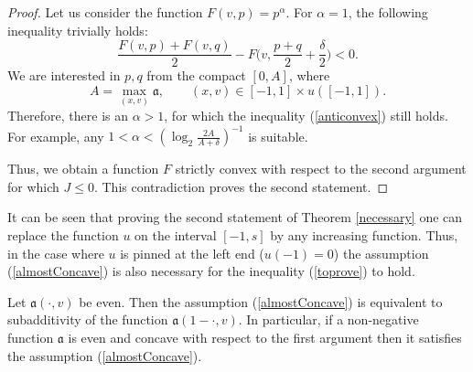 \begin{proof}
Let us consider the function $F(v, p) = p ^ \alpha$.
For $\alpha = 1$, the following inequality trivially holds:
\begin{equation}
\label{anticonvex}
\frac{F(v, p) + F(v, q)}{ 2 } - F\big(v, \frac{p + q}{ 2 } + \frac{\delta}{ 2 }\big) <0.
\end{equation}
We are interested in $p, q$ from the compact $[0 , A]$,
where 
\begin{equation}
\label{weightMax}
A=\max \limits_{(x, v)} \mathfrak a,\qquad (x, v) \in [-1, 1 ] \times u([-1, 1] ).
\end{equation}
Therefore, there is an $\alpha> 1$, for which the inequality (\ref{anticonvex})
still holds.
For example, any $1 < \alpha < (\log_2 \frac{ 2 A}{A + \delta})^{-1}$ is suitable.

Thus, we obtain a function $F$ strictly convex with respect to the second argument
for which $J \le 0$. This contradiction proves the second statement.
\end{proof}

\begin{rem}
\label{landesNecessary}
It can be seen that proving the second statement of Theorem \ref{necessary}
one can replace the function $u$ on the interval $[-1, s]$ by any increasing function.
Thus, in the case where $u$ is pinned at the left end {\rm ($u(-1) = 0$)}
the assumption (\ref{almostConcave}) is also necessary for the inequality (\ref{toprove}) to hold.
\end{rem}

\begin{rem}
Let $\mathfrak a(\cdot, v)$ be even.
Then the assumption (\ref{almostConcave}) is equivalent to subadditivity of the function $\mathfrak a(1 - \cdot, v)$.
In particular, if a non-negative function $\mathfrak a$ is even and concave with respect to the first argument then it satisfies the assumption (\ref{almostConcave}).
\end{rem}

